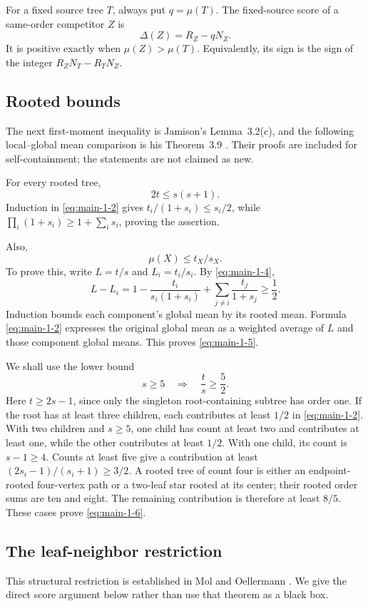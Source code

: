 \documentclass[11pt,letterpaper]{article}
\theoremstyle{plain}
\begin{document}
For a fixed source tree \(T\), always put \(q=\mu(T)\). The fixed-source score of a same-order competitor \(Z\) is \[
\Delta(Z)=R_Z-qN_Z.
\tag{1.3}\label{eq:main-1-3}
\] It is positive exactly when \(\mu(Z)>\mu(T)\). Equivalently, its sign is the sign of the integer \(R_ZN_T-R_TN_Z\).

\subsection{Rooted bounds}\label{rooted-bounds}
The next first-moment inequality is Jamison's Lemma~3.2(c), and the following local--global mean comparison is his Theorem~3.9 \cite{Jamison1983}. Their proofs are included for self-containment; the statements are not claimed as new.


For every rooted tree, \[
2t\le s(s+1).
\tag{1.4}\label{eq:main-1-4}
\] Induction in \eqref{eq:main-1-2} gives \(t_i/(1+s_i)\le s_i/2\), while \(\prod_i(1+s_i)\ge1+\sum_i s_i\), proving the assertion.

Also, \[
\mu(X)\le t_X/s_X.
\tag{1.5}\label{eq:main-1-5}
\] To prove this, write \(L=t/s\) and \(L_i=t_i/s_i\). By \eqref{eq:main-1-4}, \[
L-L_i
=1-\frac{t_i}{s_i(1+s_i)}
 +\sum_{j\ne i}\frac{t_j}{1+s_j}\ge\frac12.
\] Induction bounds each component's global mean by its rooted mean. Formula \eqref{eq:main-1-2} expresses the original global mean as a weighted average of \(L\) and those component global means. This proves \eqref{eq:main-1-5}.

We shall use the lower bound \[
s\ge5\quad\Longrightarrow\quad \frac ts\ge\frac52.
\tag{1.6}\label{eq:main-1-6}
\] Here \(t\ge2s-1\), since only the singleton root-containing subtree has order one. If the root has at least three children, each contributes at least \(1/2\) in \eqref{eq:main-1-2}. With two children and \(s\ge5\), one child has count at least two and contributes at least one, while the other contributes at least \(1/2\). With one child, its count is \(s-1\ge4\). Counts at least five give a contribution at least \((2s_i-1)/(s_i+1)\ge3/2\). A rooted tree of count four is either an endpoint-rooted four-vertex path or a two-leaf star rooted at its center; their rooted order sums are ten and eight. The remaining contribution is therefore at least \(8/5\). These cases prove \eqref{eq:main-1-6}.

\subsection{The leaf-neighbor restriction}\label{the-leaf-neighbor-restriction}
This structural restriction is established in Mol and Oellermann \cite[Theorem~3.9]{MolOellermann2019}. We give the direct score argument below rather than use that theorem as a black box.
\end{document}
